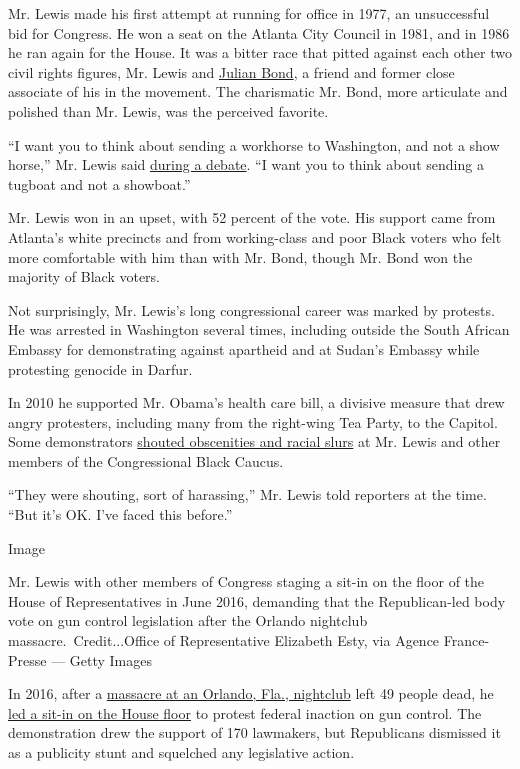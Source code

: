 Mr. Lewis made his first attempt at running for office in 1977, an
unsuccessful bid for Congress. He won a seat on the Atlanta City Council
in 1981, and in 1986 he ran again for the House. It was a bitter race
that pitted against each other two civil rights figures, Mr. Lewis and
\href{https://www.nytimes.com/2015/08/17/us/julian-bond-former-naacp-chairman-and-civil-rights-leader-dies-at-75.html}{Julian
Bond}, a friend and former close associate of his in the movement. The
charismatic Mr. Bond, more articulate and polished than Mr. Lewis, was
the perceived favorite.

``I want you to think about sending a workhorse to Washington, and not a
show horse,'' Mr. Lewis said
\href{https://www.nytimes.com/1986/08/09/us/campaign-in-georgia-strains-black-political-ties.html}{during
a debate}. ``I want you to think about sending a tugboat and not a
showboat.''

Mr. Lewis won in an upset, with 52 percent of the vote. His support came
from Atlanta's white precincts and from working-class and poor Black
voters who felt more comfortable with him than with Mr. Bond, though Mr.
Bond won the majority of Black voters.

Not surprisingly, Mr. Lewis's long congressional career was marked by
protests. He was arrested in Washington several times, including outside
the South African Embassy for demonstrating against apartheid and at
Sudan's Embassy while protesting genocide in Darfur.

In 2010 he supported Mr. Obama's health care bill, a divisive measure
that drew angry protesters, including many from the right-wing Tea
Party, to the Capitol. Some demonstrators
\href{https://www.washingtonpost.com/wp-dyn/content/article/2010/03/20/AR2010032002556.html}{shouted
obscenities and racial slurs} at Mr. Lewis and other members of the
Congressional Black Caucus.

``They were shouting, sort of harassing,'' Mr. Lewis told reporters at
the time. ``But it's OK. I've faced this before.''

Image

Mr. Lewis with other members of Congress staging a sit-in on the floor
of the House of Representatives in June 2016, demanding that the
Republican-led body vote on gun control legislation after the Orlando
nightclub massacre.~Credit...Office of Representative Elizabeth Esty,
via Agence France-Presse --- Getty Images

In 2016, after a
\href{https://www.nytimes.com/news-event/2016-orlando-shooting}{massacre
at an Orlando, Fla., nightclub} left 49 people dead, he
\href{https://www.cnn.com/2016/06/22/politics/john-lewis-sit-in-gun-violence/index.html}{led
a sit-in on the House floor} to protest federal inaction on gun control.
The demonstration drew the support of 170 lawmakers, but Republicans
dismissed it as a publicity stunt and squelched any legislative action.

